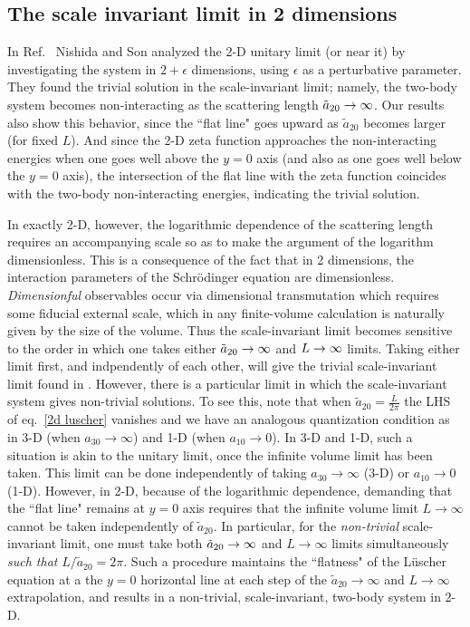 \subsection{The scale invariant limit in 2 dimensions}
In Ref.~\cite{Nishida:2006eu} Nishida and Son analyzed the 2-D unitary limit (or near it) by investigating the system in $2+\epsilon$ dimensions, using $\epsilon$ as a perturbative parameter.  They found the trivial solution in the scale-invariant limit; namely, the two-body system becomes non-interacting as the scattering length $\tilde a_{20} \rightarrow\infty$.  Our results also show this behavior, since the ``flat line" goes upward as $\tilde a_{20}$ becomes larger (for fixed $L$).  And since the 2-D zeta function approaches the non-interacting energies when one goes well above the $y=0$ axis (and also as one goes well below the $y=0$ axis), the intersection of the flat line with the zeta function coincides with the two-body non-interacting energies, indicating the trivial solution. 

In exactly 2-D, however, the logarithmic dependence of the scattering length requires an accompanying scale so as to make the argument of the logarithm dimensionless.  This is a consequence of the fact that in 2 dimensions, the interaction parameters of the Schr\"odinger equation are dimensionless.  \emph{Dimensionful} observables occur via dimensional transmutation \cite{} which requires some fiducial external scale, which in any finite-volume calculation is naturally given by the size of the volume.  Thus the scale-invariant limit becomes sensitive to the order in which one takes either $\tilde a_{20}\rightarrow\infty$ and $L\rightarrow\infty$ limits.  Taking either limit first, and indpendently of each other, will give the trivial scale-invariant limit found in \cite{Nishida:2006eu}. %
However, there is a particular limit in which the scale-invariant system gives non-trivial solutions.
To see this, note that when $\tilde a_{20}=\frac{L}{2\pi}$ the LHS of eq.~\eqref{2d luscher} vanishes and we have an analogous quantization condition as in 3-D (when $a_{30}\to\infty$) and 1-D (when $a_{10}\to 0$).  In 3-D and 1-D, such a situation is akin to the unitary limit, once the infinite volume limit has been taken.  This limit can be done independently of taking $a_{30}\to\infty$ (3-D) or $a_{10}\to0$ (1-D).  However, in 2-D, because of the logarithmic dependence, demanding that the ``flat line" remains at $y=0$ axis requires that the infinite volume limit $L\to\infty$ cannot be taken independently of $\tilde a_{20}$.  In particular, for the \emph{non-trivial} scale-invariant limit, one must take both $\tilde a_{20}\rightarrow \infty$ and $L\to\infty$ limits simultaneously \emph{such that} $L/\tilde a_{20}=2\pi$.  Such a procedure maintains the ``flatness" of the L\"uscher equation at a the $y=0$ horizontal line at each step of the $\tilde a_{20}\to\infty$ and $L\to\infty$ extrapolation, and results in a non-trivial, scale-invariant, two-body system in 2-D.  
